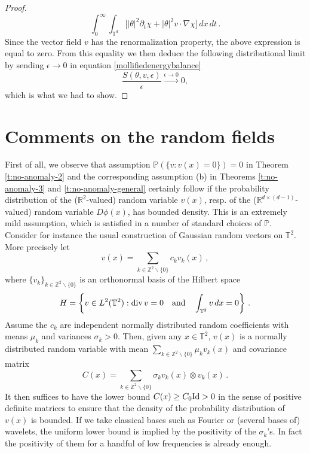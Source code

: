 \documentclass[11pt,reqno]{amsart}
\theoremstyle{definition}
\numberwithin{equation}{section}
\begin{document}
\begin{proof}
\begin{equation*}
\int_0^\infty \int_{\mathbb T^d} \bigg[ \lvert \theta \rvert^2 \partial_t \chi + \lvert \theta \rvert^2 v \cdot \nabla \chi \bigg] \, dx \, dt \,.
\end{equation*}
Since the vector field $v$ has the renormalization property, the above expression is equal to zero. From this equality we then deduce the following distributional limit by sending $\epsilon \rightarrow 0$ in equation \eqref{mollifiedenergybalance}
\begin{equation}
\frac{S(\theta,v, \epsilon)}{\epsilon} \xrightarrow[]{\epsilon \rightarrow 0} 0,
\end{equation}
which is what we had to show.
\end{proof}

\section{Comments on the random fields}

First of all, we observe that assumption $\mathbb P (\{v: v(x)=0\}) = 0$ in Theorem \ref{t:no-anomaly-2} and the corresponding assumption (b) in Theorems \ref{t:no-anomaly-3} and \ref{t:no-anomaly-general} certainly follow if the probability distribution of the ($\mathbb R^2$-valued) random variable $v(x)$, resp. of the ($\mathbb R^{d\times (d-1)}$-valued) random variable $D\phi (x)$, has bounded density. This is an extremely mild assumption, which is satisfied in a number of standard choices of $\mathbb P$. Consider for instance the usual construction of Gaussian random vectors on $\mathbb T^2$. More precisely let 
\[
v (x) = \sum_{ k \in \mathbb{Z}^2 \backslash \{ 0 \} } c_k v_k (x)\, ,
\]
where $\{v_k\}_{k \in \mathbb{Z}^2 \backslash \{ 0 \} }$ is an orthonormal basis of the Hilbert space
\[
H =\left\{v\in L^2 (\mathbb{T}^2): {\rm div}\, v=0 \quad \mbox{and} \quad \int_{\mathbb{T}^2} v \, dx  = 0\right\}\, .
\]
Assume the $c_k$ are independent normally distributed random coefficients with means $\mu_k$ and variances $\sigma_k>0$. Then, given any $x\in \mathbb T^2$, $v(x)$ is a normally distributed random variable with mean $\sum_{k \in \mathbb{Z}^2 \backslash \{ 0 \} } \mu_k v_k (x)$ and covariance matrix
\[
C (x) = \sum_{k \in \mathbb{Z}^2 \backslash \{ 0 \} } \sigma_k v_k (x) \otimes v_k (x)\, .
\]
It then suffices to have the lower bound $C(x) \geq C_0 {\rm Id} > 0$ in the sense of positive definite matrices to ensure that the density of the probability distribution of $v(x)$ is bounded. If we take classical bases such as Fourier or (several bases of) wavelets, the uniform lower bound is implied by the positivity of the $\sigma_k$'s. In fact the positivity of them for a handful of low frequencies is already enough. 
\end{document}
